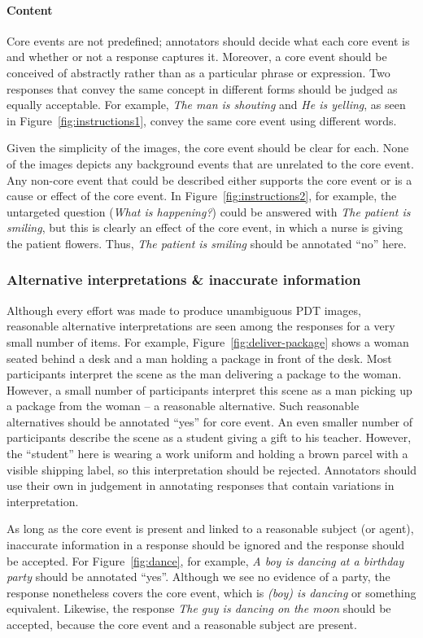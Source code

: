 \documentclass[12pt,notitlepage]{article}
\begin{document}
\paragraph{Content}
Core events are not predefined; annotators should decide what each core event is and whether or not a response captures it. Moreover, a core event should be conceived of abstractly rather than as a particular phrase or expression. Two responses that convey the same concept in different forms should be judged as equally acceptable. For example, \textit{The man is shouting} and \textit{He is yelling}, as seen in Figure~\ref{fig:instructions1}, convey the same core event using different words.

Given the simplicity of the images, the core event should be clear for each. None of the images depicts any background events that are unrelated to the core event. Any non-core event that could be described either supports the core event or is a cause or effect of the core event. In Figure~\ref{fig:instructions2}, for example, the untargeted question (\textit{What is happening?}) could be answered with \textit{The patient is smiling}, but this is clearly an effect of the core event, in which a nurse is giving the patient flowers. Thus, \textit{The patient is smiling} should be annotated ``no'' here.

\subsubsection{Alternative interpretations \& inaccurate information} Although every effort was made to produce unambiguous PDT images, reasonable alternative interpretations are seen among the responses for a very small number of items. For example, Figure~\ref{fig:deliver-package} shows a woman seated behind a desk and a man holding a package in front of the desk. Most participants interpret the scene as the man delivering a package to the woman. However, a small number of participants interpret this scene as a man picking up a package from the woman -- a reasonable alternative. Such reasonable alternatives should be annotated ``yes'' for core event. An even smaller number of participants describe the scene as a student giving a gift to his teacher. However, the ``student'' here is wearing a work uniform and holding a brown parcel with a visible shipping label, so this interpretation should be rejected. Annotators should use their own in judgement in annotating responses that contain variations in interpretation.

As long as the core event is present and linked to a reasonable subject (or agent), inaccurate information in a response should be ignored and the response should be accepted. For Figure~\ref{fig:dance}, for example, \textit{A boy is dancing at a birthday party} should be annotated ``yes''. Although we see no evidence of a party, the response nonetheless covers the core event, which is \textit{(boy) is dancing} or something equivalent. Likewise, the response \textit{The guy is dancing on the moon} should be accepted, because the core event and a reasonable subject are present.
\end{document}
